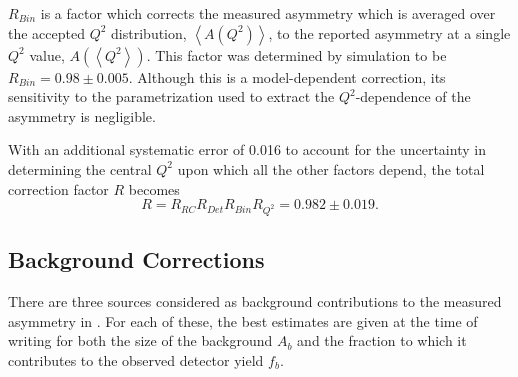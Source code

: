 $R_{Bin}$ is a factor which corrects the measured asymmetry which is averaged over the accepted $Q^2$ distribution, $\left<A(Q^2)\right>$, to the reported asymmetry at a single $Q^2$ value, $A(\left< Q^2\right>)$. This factor was determined by simulation to be $R_{Bin}=0.98\pm 0.005$. Although this is a model-dependent correction, its sensitivity to the parametrization used to extract the $Q^2$-dependence of the asymmetry is negligible.

With an additional systematic error of 0.016 to account for the uncertainty in determining the central $Q^2$ upon which all the other factors depend, the total correction factor $R$ becomes
\[
 R=R_{RC}R_{Det}R_{Bin}R_{Q^2}=0.982\pm 0.019.
\]

\subsection{Background Corrections}
There are three sources considered as background contributions to the measured asymmetry in \Q. For each of these, the best estimates are given at the time of writing for both the size of the background $A_b$ and the fraction to which it contributes to the observed detector yield $f_b$.  
